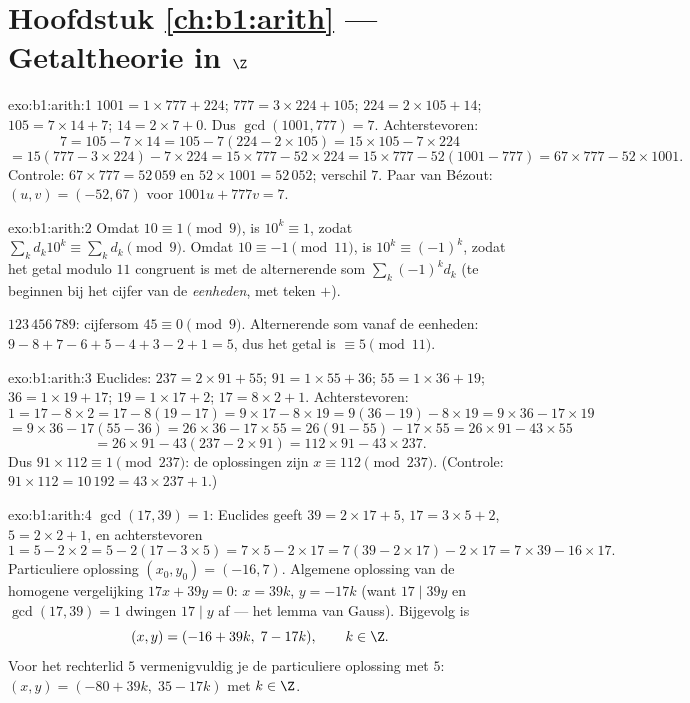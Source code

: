 \section*{Hoofdstuk \ref{ch:b1:arith} --- Getaltheorie in $\Z$}

\begin{solution}{exo:b1:arith:1}
$1001 = 1 \times 777 + 224$; $777 = 3 \times 224 + 105$; $224 = 2 \times
105 + 14$; $105 = 7 \times 14 + 7$; $14 = 2 \times 7 + 0$. Dus
$\gcd(1001, 777) = 7$. Achterstevoren:
\[
7 = 105 - 7 \times 14
= 105 - 7(224 - 2\times 105) = 15 \times 105 - 7 \times 224
\]
\[
= 15(777 - 3\times 224) - 7\times 224 = 15 \times 777 - 52 \times 224
= 15 \times 777 - 52(1001 - 777) = 67 \times 777 - 52 \times 1001 .
\]
Controle: $67 \times 777 = 52\,059$ en $52 \times 1001 = 52\,052$;
verschil $7$. Paar van Bézout: $(u, v) = (-52, 67)$ voor $1001u + 777v =
7$.
\end{solution}

\begin{solution}{exo:b1:arith:2}
Omdat $10 \equiv 1 \pmod 9$, is $10^k \equiv 1$, zodat $\sum_k d_k 10^k
\equiv \sum_k d_k \pmod 9$. Omdat $10 \equiv -1 \pmod{11}$, is $10^k
\equiv (-1)^k$, zodat het getal modulo $11$ congruent is met de
alternerende som $\sum_k (-1)^k d_k$ (te beginnen bij het cijfer van de
\emph{eenheden}, met teken $+$).

$123\,456\,789$: cijfersom $45 \equiv 0 \pmod 9$. Alternerende som vanaf
de eenheden: $9 - 8 + 7 - 6 + 5 - 4 + 3 - 2 + 1 = 5$, dus het getal is
$\equiv 5 \pmod{11}$.
\end{solution}

\begin{solution}{exo:b1:arith:3}
Euclides: $237 = 2 \times 91 + 55$; $91 = 1 \times 55 + 36$; $55 = 1
\times 36 + 19$; $36 = 1 \times 19 + 17$; $19 = 1 \times 17 + 2$; $17 = 8
\times 2 + 1$. Achterstevoren:
\[
1 = 17 - 8\times 2 = 17 - 8(19 - 17) = 9\times 17 - 8\times 19
= 9(36 - 19) - 8\times 19 = 9\times 36 - 17\times 19
\]
\[
= 9\times 36 - 17(55 - 36) = 26\times 36 - 17\times 55
= 26(91 - 55) - 17\times 55 = 26\times 91 - 43\times 55
\]
\[
= 26\times 91 - 43(237 - 2\times 91) = 112 \times 91 - 43 \times 237.
\]
Dus $91 \times 112 \equiv 1 \pmod{237}$: de oplossingen zijn $x \equiv
112 \pmod{237}$. (Controle: $91 \times 112 = 10\,192 = 43 \times 237 +
1$.)
\end{solution}

\begin{solution}{exo:b1:arith:4}
$\gcd(17, 39) = 1$: Euclides geeft $39 = 2\times 17 + 5$, $17 = 3\times 5
+ 2$, $5 = 2\times 2 + 1$, en achterstevoren
\[
1 = 5 - 2\times 2 = 5 - 2(17 - 3\times 5) = 7\times 5 - 2\times 17
= 7(39 - 2\times 17) - 2\times 17 = 7\times 39 - 16\times 17 .
\]
Particuliere oplossing $(x_0, y_0) = (-16, 7)$. Algemene oplossing van de
homogene vergelijking $17x + 39y = 0$: $x = 39k$, $y = -17k$ (want $17
\mid 39y$ en $\gcd(17,39) = 1$ dwingen $17 \mid y$ af --- het lemma van
Gauss). Bijgevolg is
\[
(x, y) = (-16 + 39k,\; 7 - 17k), \qquad k \in \Z .
\]
Voor het rechterlid $5$ vermenigvuldig je de particuliere oplossing met
$5$: $(x, y) = (-80 + 39k,\; 35 - 17k)$ met $k \in \Z$.
\end{solution}

